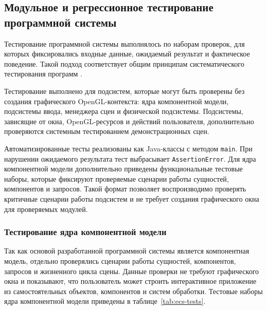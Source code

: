 \subsection{Модульное и регрессионное тестирование программной системы}

Тестирование программной системы выполнялось по наборам проверок, для которых
фиксировались входные данные, ожидаемый результат и фактическое поведение. Такой
подход соответствует общим принципам систематического тестирования программ
\cite{myers-testing}.

Тестирование выполнено для подсистем, которые могут быть проверены без создания
графического OpenGL-контекста: ядра компонентной модели, подсистемы ввода,
менеджера сцен и физической подсистемы. Подсистемы, зависящие от окна,
OpenGL-ресурсов и действий пользователя, дополнительно проверяются системным
тестированием демонстрационных сцен.

Автоматизированные тесты реализованы как Java-классы с методом \texttt{main}.
При нарушении ожидаемого результата тест выбрасывает \texttt{AssertionError}. Для
ядра компонентной модели дополнительно приведены функциональные тестовые наборы,
которые фиксируют проверяемые сценарии работы сущностей, компонентов и запросов.
Такой формат позволяет воспроизводимо проверять критичные сценарии работы
подсистем и не требует создания графического окна для проверяемых модулей.

\subsubsection{Тестирование ядра компонентной модели}

Так как основой разработанной программной системы является компонентная модель,
отдельно проверялись сценарии работы сущностей, компонентов, запросов и
жизненного цикла сцены. Данные проверки не требуют графического окна и
показывают, что пользователь может строить интерактивное приложение из
самостоятельных объектов, компонентов и систем обработки. Тестовые наборы ядра
компонентной модели приведены в таблице~\ref{tab:ecs-tests}.

